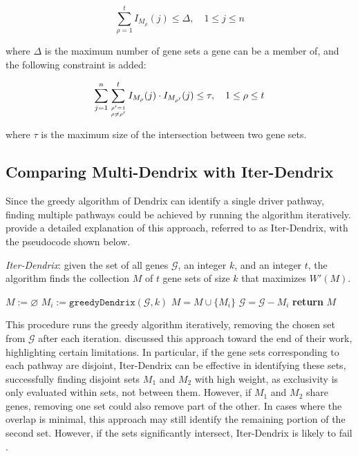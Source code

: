 \begin{equation}
    \sum_{\rho = 1}^t {I_{M_\rho}(j) \le \Delta}, \quad 1 \le j \le n
\end{equation}

where $\Delta$ is the maximum number of gene sets a gene can be a member of, and the following constraint is added:

\begin{equation}
    \sum_{j = 1}^n {\sum_{\rho' = 1 \atop \rho \neq \rho'}^t {{I_{M_\rho} (j) \cdot I_{M_{\rho'}} (j)}}} \le \tau, \quad 1 \le \rho \le t
\end{equation}

where $\tau$ is the maximum size of the intersection between two gene sets.

\subsection{Comparing Multi-Dendrix with Iter-Dendrix}

Since the greedy algorithm of Dendrix can identify a single driver pathway, finding multiple pathways could be achieved by running the algorithm iteratively. \textcite{multi-dendrix} provide a detailed explanation of this approach, referred to as Iter-Dendrix, with the pseudocode shown below.

\begin{algorithm}[H]
    \caption{
        \textit{Iter-Dendrix}: given the set of all genes $\mathcal G$, an integer $k$, and an integer $t$, the algorithm finds the collection $M$ of $t$ gene sets of size $k$ that maximizes $W'(M)$.
    }

        \label{iter-dendrix}
    \begin{algorithmic}[1]
            \State $M := \varnothing$
            \State $M_i := \texttt{greedyDendrix}(\mathcal G, k)$ 
                \State $M = M \cup \{M_i\}$
                \State $\mathcal G = \mathcal G - M_i$
            \EndFor
            \State \textbf{return} $M$
        \EndFunction
    \end{algorithmic}
\end{algorithm}

This procedure runs the greedy algorithm iteratively, removing the chosen set from $\mathcal{G}$ after each iteration. \textcite{dendrix} discussed this approach toward the end of their work, highlighting certain limitations. In particular, if the gene sets corresponding to each pathway are disjoint, Iter-Dendrix can be effective in identifying these sets, successfully finding disjoint sets $M_1$ and $M_2$ with high weight, as exclusivity is only evaluated within sets, not between them. However, if $M_1$ and $M_2$ share genes, removing one set could also remove part of the other. In cases where the overlap is minimal, this approach may still identify the remaining portion of the second set. However, if the sets significantly intersect, Iter-Dendrix is likely to fail \cite{dendrix}.

